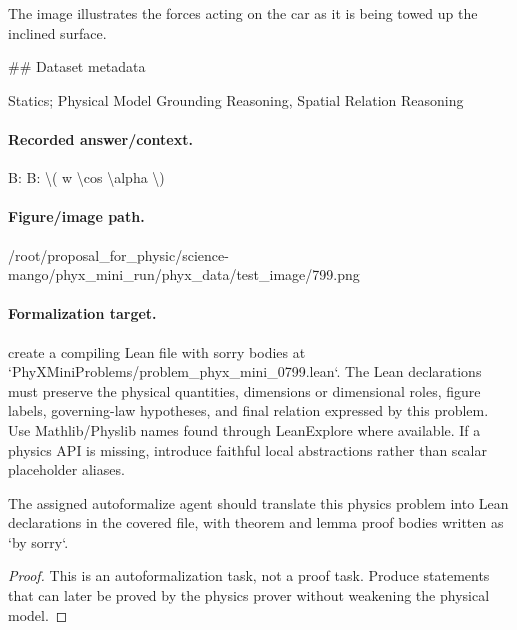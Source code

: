 The image illustrates the forces acting on the car as it is being towed up the inclined surface.

\#\# Dataset metadata

Statics; Physical Model Grounding Reasoning, Spatial Relation Reasoning

\paragraph{Recorded answer/context.}
B: B: \textbackslash{}( w \textbackslash{}cos \textbackslash{}alpha \textbackslash{})

\paragraph{Figure/image path.}
/root/proposal\_for\_physic/science-mango/phyx\_mini\_run/phyx\_data/test\_image/799.png

\paragraph{Formalization target.}
create a compiling Lean file with sorry bodies at `PhyXMiniProblems/problem\_phyx\_mini\_0799.lean`. The Lean declarations must preserve the physical quantities, dimensions or dimensional roles, figure labels, governing-law hypotheses, and final relation expressed by this problem.
Use Mathlib/Physlib names found through LeanExplore where available. If a physics API is missing, introduce faithful local abstractions rather than scalar placeholder aliases.

\begin{theorem}
\label{thm:physics:phyx_mini_0799:target}
The assigned autoformalize agent should translate this physics problem into Lean declarations in the covered file, with theorem and lemma proof bodies written as `by sorry`.
\end{theorem}
\begin{proof}
This is an autoformalization task, not a proof task. Produce statements that can later be proved by the physics prover without weakening the physical model.
\end{proof}

